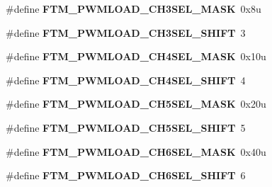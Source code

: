 \begin{DoxyCompactItemize}
\item 
\#define {\bfseries F\+T\+M\+\_\+\+P\+W\+M\+L\+O\+A\+D\+\_\+\+C\+H3\+S\+E\+L\+\_\+\+M\+A\+SK}~0x8u\hypertarget{group__FTM__Register__Masks_gacbe9716a0b6c45b6e509f4060145ecc0}{}\label{group__FTM__Register__Masks_gacbe9716a0b6c45b6e509f4060145ecc0}

\item 
\#define {\bfseries F\+T\+M\+\_\+\+P\+W\+M\+L\+O\+A\+D\+\_\+\+C\+H3\+S\+E\+L\+\_\+\+S\+H\+I\+FT}~3\hypertarget{group__FTM__Register__Masks_ga2af1a060bebe8e48c468cce81a2364d8}{}\label{group__FTM__Register__Masks_ga2af1a060bebe8e48c468cce81a2364d8}

\item 
\#define {\bfseries F\+T\+M\+\_\+\+P\+W\+M\+L\+O\+A\+D\+\_\+\+C\+H4\+S\+E\+L\+\_\+\+M\+A\+SK}~0x10u\hypertarget{group__FTM__Register__Masks_ga5c780b58f08500bc357b62c904dc1c97}{}\label{group__FTM__Register__Masks_ga5c780b58f08500bc357b62c904dc1c97}

\item 
\#define {\bfseries F\+T\+M\+\_\+\+P\+W\+M\+L\+O\+A\+D\+\_\+\+C\+H4\+S\+E\+L\+\_\+\+S\+H\+I\+FT}~4\hypertarget{group__FTM__Register__Masks_gafdff910b7b4bc4961ef1852efddacbb5}{}\label{group__FTM__Register__Masks_gafdff910b7b4bc4961ef1852efddacbb5}

\item 
\#define {\bfseries F\+T\+M\+\_\+\+P\+W\+M\+L\+O\+A\+D\+\_\+\+C\+H5\+S\+E\+L\+\_\+\+M\+A\+SK}~0x20u\hypertarget{group__FTM__Register__Masks_ga1b66f571d4fb653183ca2b59bcfeebce}{}\label{group__FTM__Register__Masks_ga1b66f571d4fb653183ca2b59bcfeebce}

\item 
\#define {\bfseries F\+T\+M\+\_\+\+P\+W\+M\+L\+O\+A\+D\+\_\+\+C\+H5\+S\+E\+L\+\_\+\+S\+H\+I\+FT}~5\hypertarget{group__FTM__Register__Masks_gac43e037a7c4b7b7d32dc52b11914d97f}{}\label{group__FTM__Register__Masks_gac43e037a7c4b7b7d32dc52b11914d97f}

\item 
\#define {\bfseries F\+T\+M\+\_\+\+P\+W\+M\+L\+O\+A\+D\+\_\+\+C\+H6\+S\+E\+L\+\_\+\+M\+A\+SK}~0x40u\hypertarget{group__FTM__Register__Masks_gaefdd87aac092c115ca16834df416a021}{}\label{group__FTM__Register__Masks_gaefdd87aac092c115ca16834df416a021}

\item 
\#define {\bfseries F\+T\+M\+\_\+\+P\+W\+M\+L\+O\+A\+D\+\_\+\+C\+H6\+S\+E\+L\+\_\+\+S\+H\+I\+FT}~6\hypertarget{group__FTM__Register__Masks_ga750eddbdde44f9f3a1a49cb8db15b7de}{}\label{group__FTM__Register__Masks_ga750eddbdde44f9f3a1a49cb8db15b7de}


\end{DoxyCompactItemize}
